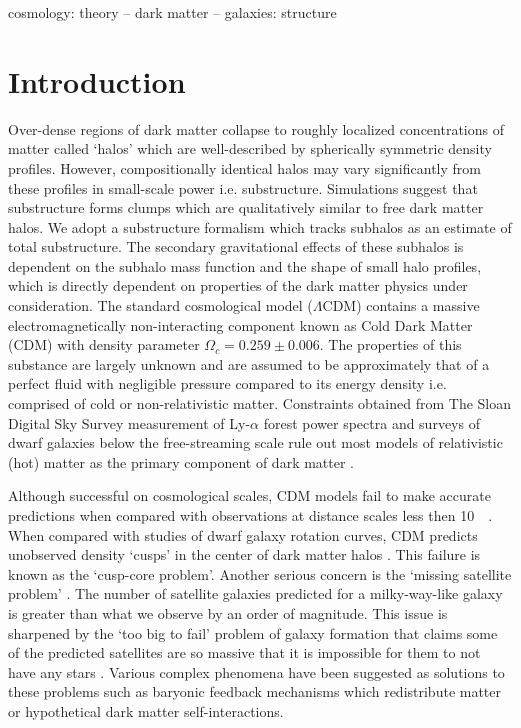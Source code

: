 \documentclass[usenatbib]{mnras}
\newcommand{\squote}[1]{\lq #1\rq}
\newcommand{\lcdm}{$\Lambda$CDM}
\begin{document}
\begin{keywords}
cosmology: theory -- dark matter -- galaxies: structure
\end{keywords}

\section{Introduction}
	Over-dense regions of dark matter collapse to roughly localized concentrations of matter called ‘halos’ which are well-described by spherically symmetric density profiles. However, compositionally identical halos may vary significantly from these profiles in small-scale power i.e. substructure. Simulations suggest that substructure forms clumps which are qualitatively similar to free dark matter halos. We adopt a substructure formalism which tracks subhalos as an estimate of total substructure. The secondary gravitational effects of these subhalos is dependent on the subhalo mass function and the shape of small halo profiles, which is directly dependent on properties of the dark matter physics under consideration.                
        The standard cosmological model (\lcdm) contains a massive electromagnetically non-interacting component known as Cold Dark Matter (CDM) with density parameter $\Omega_c = 0.259 \pm 0.006$. The properties of this substance are largely unknown and are assumed to be approximately that of a perfect fluid with negligible pressure compared to its energy density i.e. comprised of cold or non-relativistic matter. Constraints obtained from The Sloan Digital Sky Survey measurement of Ly-$\alpha$ forest power spectra and surveys of dwarf galaxies below the free-streaming scale rule out most models of relativistic (hot) matter as the primary component of dark matter \citep{can_neutrinos}. 
\par
        Although successful on cosmological scales, CDM models fail to make accurate predictions when compared with observations at distance scales less then \SI{10}{\kilo\parsec}. When compared with studies of dwarf galaxy rotation curves, CDM predicts unobserved density \squote{cusps} in the center of dark matter halos \citep{ultralight}. This failure is known as the \squote{cusp-core problem}. Another serious concern is the \squote{missing satellite problem}  \citep{missing_satellites}. The number of satellite galaxies predicted for a milky-way-like galaxy is greater than what we observe by an order of magnitude. This issue is sharpened by the \squote{too big to fail} problem of galaxy formation that claims some of the predicted satellites are so massive that it is impossible for them to not have any stars \citep{too_big_to_fail}. Various complex phenomena have been suggested as solutions to these problems such as baryonic feedback mechanisms which redistribute matter or  hypothetical dark matter self-interactions.
\end{document}
